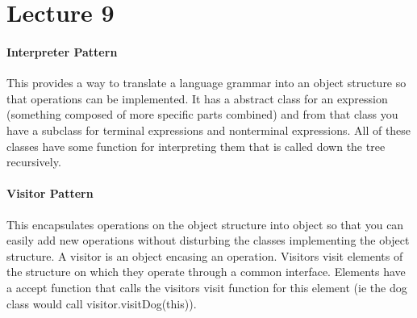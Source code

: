 \documentclass{article}
\begin{document}

\section*{Lecture 9} %
\label{sec:lecture_9}
\paragraph{Interpreter Pattern} %
\label{par:interpreter_pattern}
This provides a way to translate a language grammar into an object structure so that operations can be implemented. It has a abstract class for an expression (something composed of more specific parts combined) and from that class you have a subclass for terminal expressions and nonterminal expressions. All of these classes have some function for interpreting them that is called down the tree recursively.

\paragraph{Visitor Pattern} %
\label{par:visitor_pattern}
This encapsulates operations on the object structure into object so that you can easily add new operations without disturbing the classes implementing the object structure. A visitor is an object encasing an operation. Visitors visit elements of the structure on which they operate through a common interface. Elements have a accept function that calls the visitors visit function for this element (ie the dog class would call visitor.visitDog(this)).
\end{document}
